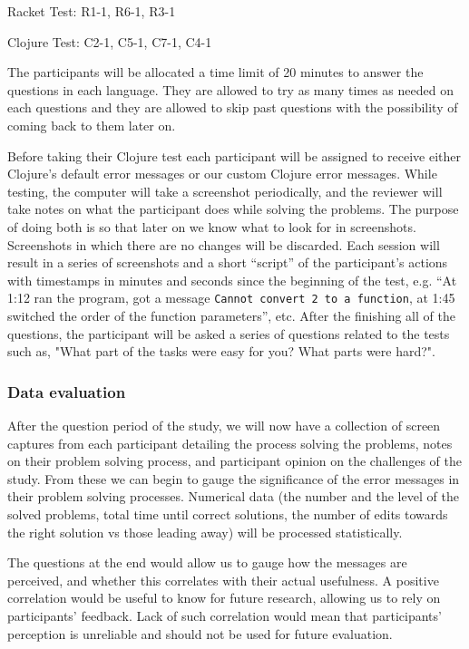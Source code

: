 \documentclass[submission,copyright,creativecommons]{eptcs}
\begin{document}
Racket Test: R1-1, R6-1, R3-1

Clojure Test: C2-1, C5-1, C7-1, C4-1


	The participants will be allocated a time limit of 20 minutes to answer the questions in each language. 
They are allowed to try as many times as needed on each questions and they are allowed to skip past questions with the possibility of coming back to them later on. 

Before taking their Clojure test each participant will  be assigned to receive either Clojure's default error messages or our custom Clojure error messages.
While testing, the computer will take a screenshot periodically, and the reviewer will take notes on what the participant does while solving the problems.
The purpose of doing both is so that later on we know what to look for in screenshots. Screenshots in which there are no changes will be discarded. 
Each session will result in a series of screenshots and a short ``script'' of the participant's actions with timestamps in minutes and seconds since the beginning of the test, e.g. ``At 1:12 ran the program, got a message \texttt{Cannot convert 2 to a function}, at 1:45 switched the order of the function parameters'', etc.
After the finishing all of the questions, the participant will be asked a series of questions related to the tests such as, "What part of the tasks were easy for you? What parts were hard?".

\subsubsection{Data evaluation}\label{subsec:evaluation}

After the question period of the study, we will now have a collection of screen captures from each participant detailing the process solving the problems, notes on their problem solving process, and participant opinion on the challenges of the study.
From these we can begin to gauge the significance of the error messages in their problem solving processes. 
Numerical data (the number and the level of the solved problems, total time until correct solutions, the number of edits towards the right solution vs those leading away) will be processed statistically. 

The questions at the end would allow us to gauge how the messages are perceived, and whether this correlates with their actual usefulness. A positive correlation would be useful to know for future research, allowing us to rely on participants' feedback. 
Lack of such correlation would mean that participants' perception is unreliable and should not be used for future evaluation.  
\end{document}
